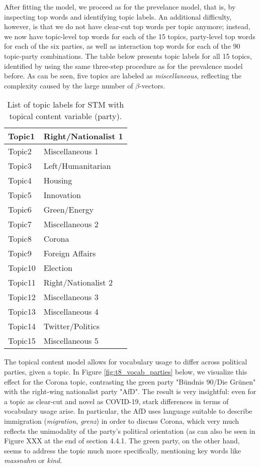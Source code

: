 \documentclass[12pt]{article}
\begin{document}
After fitting the model, we proceed as for the prevelance model, that is, by inspecting top words and identifying topic labels. An additional difficulty, however, is that we do not have clear-cut top words per topic anymore; instead, we now have topic-level top words for each of the 15 topics, party-level top words for each of the six parties, as well as interaction top words for each of the 90 topic-party combinations. The table below presents topic labels for all 15 topics, identified by using the same three-step procedure as for the prevalence model before. As can be seen, five topics are labeled as \textit{miscellaneous}, reflecting the complexity caused by the large number of $\beta$-vectors.

\begin{table}[h!]
	\centering
	\captionsetup{justification=centering,margin=2cm}
	\begin{tabular}{|l|l|}
	\hline
	Topic1  & Right/Nationalist 1  \\ \hline
	Topic2  & Miscellaneous 1      \\ \hline
	Topic3  & Left/Humanitarian    \\ \hline
	Topic4  & Housing       	   \\ \hline
	Topic5  & Innovation           \\ \hline
	Topic6  & Green/Energy         \\ \hline
	Topic7  & Miscellaneous 2      \\ \hline
	Topic8  & Corona               \\ \hline
	Topic9  & Foreign Affairs      \\ \hline
	Topic10 & Election             \\ \hline
	Topic11 & Right/Nationalist 2  \\ \hline
	Topic12 & Miscellaneous 3      \\ \hline
	Topic13 & Miscellaneous 4      \\ \hline
	Topic14 & Twitter/Politics     \\ \hline
	Topic15 & Miscellaneous 5      \\ \hline
	\end{tabular}
	\caption{List of topic labels for STM with topical content variable (party).}
	\label{Tab:labels_content}
\end{table}

The topical content model allows for vocabulary usage to differ across political parties, given a topic. In Figure \ref{fig:t8_vocab_parties} below, we visualize this effect for the Corona topic, contrasting the green party "Bündnis 90/Die Grünen" with the right-wing nationalist party "AfD". The result is very insightful: even for a topic as clear-cut and novel as COVID-19, stark differences in terms of vocabulary usage arise. In particular, the AfD uses language suitable to describe immigration (\textit{migration}, \textit{grenz}) in order to discuss Corona, which very much reflects the unimodality of the party's political orientation (as can also be seen in Figure XXX at the end of section 4.4.1. The green party, on the other hand, seems to address the topic much more specifically, mentioning key words like \textit{massnahm} or \textit{kind}.
\end{document}
